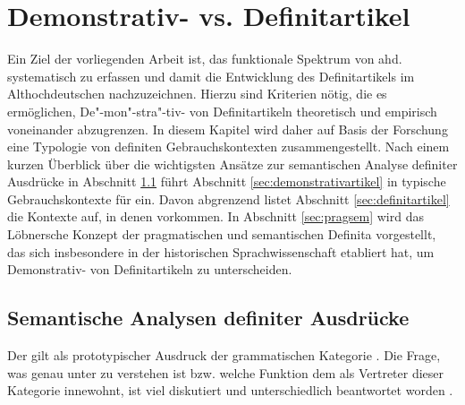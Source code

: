 \chapter{Demonstrativ- vs. Definitartikel}\label{chap:demdef}

Ein Ziel der vorliegenden Arbeit ist, das funktionale Spektrum von ahd.  systematisch zu erfassen und damit die Entwicklung des Definitartikels  im Althochdeutschen nachzuzeichnen. Hierzu sind  Kriterien nötig, die es ermöglichen, De"-mon"-stra"-tiv- von   Definitartikeln  theoretisch und empirisch voneinander abzugrenzen. In diesem Kapitel wird daher auf Basis der Forschung eine Typologie von definiten Gebrauchskontexten zusammengestellt. Nach einem kurzen Überblick über die wichtigsten Ansätze zur semantischen Analyse definiter Ausdrücke in Abschnitt \ref{sec:definitheitstheorien} führt Abschnitt \ref{sec:demonstrativartikel} in typische Gebrauchskontexte für   ein. Davon abgrenzend listet Abschnitt \ref{sec:definitartikel} die Kontexte auf, in denen  vorkommen. In Abschnitt \ref{sec:pragsem} wird das  Löbnersche Konzept der pragmatischen  und semantischen Definita  vorgestellt, das sich insbesondere in der historischen Sprachwissenschaft etabliert hat, um Demonstrativ- von Definitartikeln   zu unterscheiden. 

\section{Semantische Analysen definiter Ausdrücke} \label{sec:definitheitstheorien}

Der  gilt als prototypischer Ausdruck der grammatischen Kategorie . Die Frage, was genau unter  zu verstehen ist bzw. welche Funktion dem  als Vertreter dieser Kategorie innewohnt, ist viel diskutiert und unterschiedlich beantwortet worden \parencite[zum Überblick  s.][]{Bisle-Muller1991,Hauenschild1993,Lyons1999,Abbott2007,Cui2014}.

